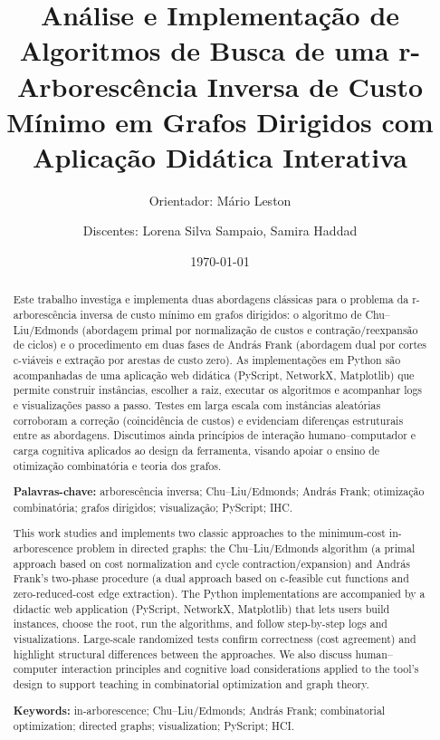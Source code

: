 \documentclass[12pt,a4paper]{article}
\title{Análise e Implementação de Algoritmos de Busca de uma r-Arborescência Inversa de Custo Mínimo em Grafos Dirigidos com Aplicação Didática Interativa}
\author{Orientador: Mário Leston 
\and Discentes: Lorena Silva Sampaio, Samira Haddad}
\date{\today}
\begin{document}
\maketitle

\begin{abstract}
Este trabalho investiga e implementa duas abordagens clássicas para o problema da r-arborescência inversa de custo mínimo em grafos dirigidos: o algoritmo de Chu--Liu/Edmonds (abordagem primal por normalização de custos e contração/reexpansão de ciclos) e o procedimento em duas fases de András Frank (abordagem dual por cortes c-viáveis e extração por arestas de custo zero). As implementações em Python são acompanhadas de uma aplicação web didática (PyScript, NetworkX, Matplotlib) que permite construir instâncias, escolher a raiz, executar os algoritmos e acompanhar logs e visualizações passo a passo. Testes em larga escala com instâncias aleatórias corroboram a correção (coincidência de custos) e evidenciam diferenças estruturais entre as abordagens. Discutimos ainda princípios de interação humano--computador e carga cognitiva aplicados ao design da ferramenta, visando apoiar o ensino de otimização combinatória e teoria dos grafos.

\medskip
\noindent\textbf{Palavras-chave:} arborescência inversa; Chu--Liu/Edmonds; András Frank; otimização combinatória; grafos dirigidos; visualização; PyScript; IHC.
\end{abstract}

\begin{abstract}
This work studies and implements two classic approaches to the minimum-cost in-arborescence problem in directed graphs: the Chu--Liu/Edmonds algorithm (a primal approach based on cost normalization and cycle contraction/expansion) and András Frank's two-phase procedure (a dual approach based on c-feasible cut functions and zero-reduced-cost edge extraction). The Python implementations are accompanied by a didactic web application (PyScript, NetworkX, Matplotlib) that lets users build instances, choose the root, run the algorithms, and follow step-by-step logs and visualizations. Large-scale randomized tests confirm correctness (cost agreement) and highlight structural differences between the approaches. We also discuss human–computer interaction principles and cognitive load considerations applied to the tool's design to support teaching in combinatorial optimization and graph theory.

\medskip
\noindent\textbf{Keywords:} in-arborescence; Chu--Liu/Edmonds; András Frank; combinatorial optimization; directed graphs; visualization; PyScript; HCI.
\end{abstract}
\end{document}
